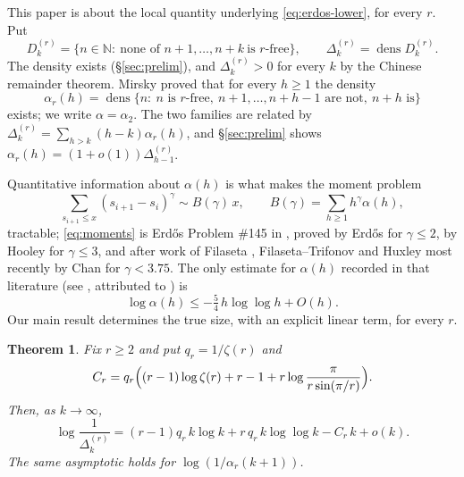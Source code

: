 \documentclass[10pt,a4paper]{amsart}
\newtheorem{theorem}{Theorem}[section]
\numberwithin{equation}{section}
\newcommand{\N}{\mathbb{N}}
\DeclareMathOperator{\dens}{dens}
\begin{document}
This paper is about the local quantity underlying \eqref{eq:erdos-lower}, for every $r$.
Put
\begin{equation}\label{eq:def-D}
  D^{(r)}_k=\{n\in\N:\ \text{none of } n+1,\dots,n+k\ \text{is } r\text{-free}\},\qquad
  \Delta^{(r)}_k=\dens D^{(r)}_k .
\end{equation}
The density exists (\S\ref{sec:prelim}), and $\Delta^{(r)}_k>0$ for every $k$ by the
Chinese remainder theorem. Mirsky \cite[Thm.~4]{Mirsky} proved that for every $h\ge1$ the
density
\begin{equation}\label{eq:def-alpha}
  \alpha_r(h)=\dens\{n:\ n\text{ is }r\text{-free},\ n+1,\dots,n+h-1\text{ are not},\
  n+h\text{ is}\}
\end{equation}
exists; we write $\alpha=\alpha_2$. The two families are related by
$\Delta^{(r)}_k=\sum_{h>k}(h-k)\alpha_r(h)$, and \S\ref{sec:prelim} shows
$\alpha_r(h)=(1+o(1))\Delta^{(r)}_{h-1}$.

Quantitative information about $\alpha(h)$ is what makes the moment problem
\begin{equation}\label{eq:moments}
  \sum_{s_{i+1}\le x}(s_{i+1}-s_i)^{\gamma}\sim B(\gamma)\,x,
  \qquad B(\gamma)=\sum_{h\ge1}h^{\gamma}\alpha(h),
\end{equation}
tractable; \eqref{eq:moments} is Erd\H{o}s Problem \#145 in \cite{Bloom}, proved by
Erd\H{o}s \cite{Erdos1951} for $\gamma\le2$, by Hooley \cite{Hooley} for $\gamma\le3$, and
after work of Filaseta \cite{Filaseta1993}, Filaseta--Trifonov \cite{FT1996} and Huxley
\cite{Huxley1997,Huxley2000} most recently by Chan \cite{Chan} for $\gamma<3.75$. The only
estimate for $\alpha(h)$ recorded in that literature (see \cite[(2)]{Chan}, attributed to
\cite[Lemma~1]{Huxley1997}) is
\begin{equation}\label{eq:huxley-lemma}
  \log\alpha(h)\le-\tfrac54\,h\log\log h+O(h).
\end{equation}
Our main result determines the true size, with an explicit linear term, for every $r$.


\begin{theorem}\label{thm:main}
Fix $r\ge2$ and put $q_r=1/\zeta(r)$ and
\begin{equation}\label{eq:Cr}
  C_r=q_r\Bigl((r-1)\log\zeta(r)+r-1+r\log\frac{\pi}{r\sin(\pi/r)}\Bigr).
\end{equation}
Then, as $k\to\infty$,
\[
  \log\frac1{\Delta^{(r)}_k}
  =(r-1)q_r\,k\log k+r\,q_r\,k\log\log k-C_r\,k+o(k).
\]
The same asymptotic holds for $\log(1/\alpha_r(k+1))$.
\end{theorem}
\end{document}
